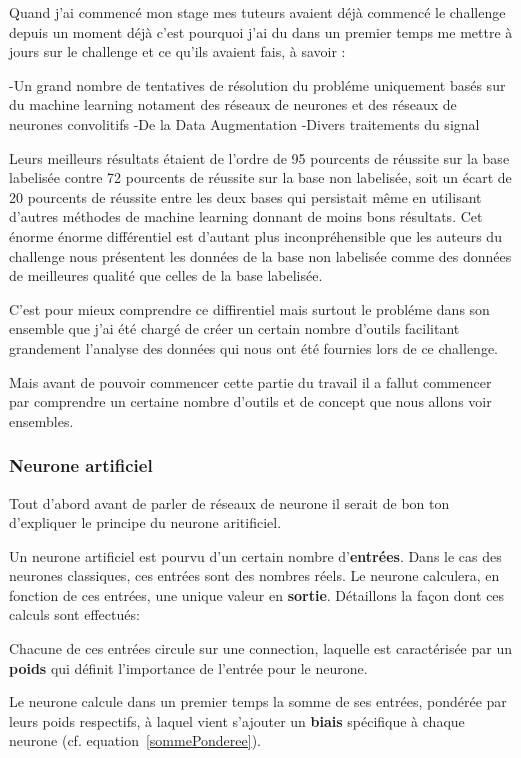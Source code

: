 Quand j'ai commencé mon stage mes tuteurs avaient déjà commencé le challenge depuis un moment déjà c'est pourquoi j'ai du dans un premier temps me mettre à jours sur le challenge et ce qu'ils avaient fais, à savoir :

-Un grand nombre de tentatives de résolution du probléme uniquement basés sur du machine learning notament des réseaux de neurones et des réseaux de neurones convolitifs
-De la Data Augmentation
-Divers traitements du signal

Leurs meilleurs résultats étaient de l'ordre de 95 pourcents de réussite sur la base labelisée contre 72 pourcents de réussite sur la base non labelisée, soit un écart de 20 pourcents de réussite entre les deux bases qui persistait même en utilisant d'autres méthodes de machine learning donnant de moins bons résultats.
Cet énorme énorme différentiel est d'autant plus inconpréhensible que les auteurs du challenge nous présentent les données de la base non labelisée comme des données de meilleures qualité que celles de la base labelisée.

C'est pour mieux comprendre ce diffirentiel mais surtout le probléme dans son ensemble que j'ai été chargé de créer un certain nombre d'outils facilitant grandement l'analyse des données qui nous ont été fournies lors de ce challenge.

Mais avant de pouvoir commencer cette partie du travail il a fallut commencer par comprendre un certaine nombre d'outils et de concept que nous allons voir ensembles.


\hypertarget{Neurone-artificiel}{%
\subsubsection{Neurone artificiel}
\label{Neurone-artificiel}}
Tout d'abord avant de parler de réseaux de neurone il serait de bon ton d'expliquer le principe du neurone aritificiel.

Un neurone artificiel est pourvu d'un certain nombre d'\textbf{entrées}. Dans le cas des neurones classiques, ces entrées sont des nombres réels. Le neurone calculera, en fonction de ces entrées, une unique valeur en \textbf{sortie}.
Détaillons la façon dont ces calculs sont effectués:

Chacune de ces entrées circule sur une connection, laquelle est caractérisée par un \textbf{poids} qui définit l'importance de l'entrée pour le neurone.

Le neurone calcule dans un premier temps la somme de ses entrées, pondérée par leurs poids respectifs, à laquel vient s'ajouter un \textbf{biais} spécifique à chaque neurone (cf. equation~\ref{sommePonderee}).

